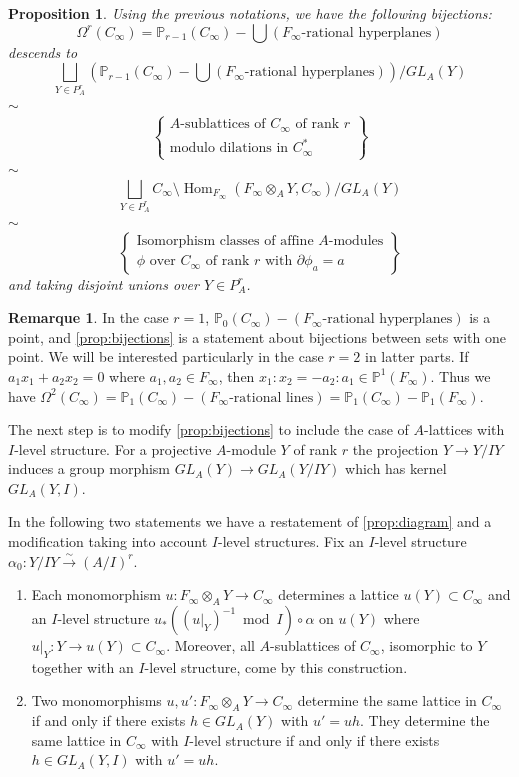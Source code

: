 \documentclass[12pt,a4paper]{article}
\theoremstyle{plain}
\newtheorem{proposition}{Proposition}[section]
\theoremstyle{definition}
\newtheorem{remark}{Remarque}[section]
\theoremstyle{remark}
\DeclareMathOperator{\Hom}{Hom}
\newcommand{\bP}{\mathbb{P}}
\providecommand{\Hom}{\operatorname{Hom}}
\begin{document}
\begin{proposition}
\label{prop:bijections}
Using the previous notations, we have the following bijections:
\[
\Omega^r(C_\infty) = \bP_{r-1}(C_\infty) - \bigcup (F_\infty\text{-rational hyperplanes})
\]
descends to
\[
\bigsqcup_{Y \in P_A^r} (\bP_{r-1}(C_\infty) - \bigcup (F_\infty\text{-rational hyperplanes}))/GL_A(Y)
\]
$\sim$
\[
\left\{\begin{array}{c}
A\text{-sublattices of } C_\infty \text{ of rank } r \\
\text{modulo dilations in } C_\infty^*
\end{array}\right\}
\]
$\sim$
\[
\bigsqcup_{Y \in P_A^r} C_\infty \setminus \Hom_{F_\infty}(F_\infty \otimes_A Y, C_\infty)/GL_A(Y)
\]
$\sim$
\[
\left\{\begin{array}{c}
\text{Isomorphism classes of affine } A\text{-modules} \\
\phi \text{ over } C_\infty \text{ of rank } r \text{ with } \partial \phi_a = a
\end{array}\right\}
\]
and taking disjoint unions over $Y \in P_A^r$.
\end{proposition}

\begin{remark}
\label{rem:r=1}
In the case $r = 1$, $\bP_0(C_\infty) - (F_\infty\text{-rational hyperplanes})$ is a point, and \eqref{prop:bijections} is a statement about bijections between sets with one point. We will be interested particularly in the case $r = 2$ in latter parts. If $a_1 x_1 + a_2 x_2 = 0$ where $a_1, a_2 \in F_\infty$, then $x_1 : x_2 = -a_2 : a_1 \in \bP^1(F_\infty)$. Thus we have $\Omega^2(C_\infty) = \bP_1(C_\infty) - (F_\infty\text{-rational lines}) = \bP_1(C_\infty) - \bP_1(F_\infty)$.
\end{remark}

The next step is to modify \eqref{prop:bijections} to include the case of $A$-lattices with $I$-level structure. For a projective $A$-module $Y$ of rank $r$ the projection $Y \to Y/IY$ induces a group morphism $GL_A(Y) \to GL_A(Y/IY)$ which has kernel $GL_A(Y, I)$.

In the following two statements we have a restatement of \eqref{prop:diagram} and a modification taking into account $I$-level structures. Fix an $I$-level structure $\alpha_0: Y/IY \xrightarrow{\sim} (A/I)^r$.

\begin{enumerate}[label=(\arabic*)]
\item Each monomorphism $u: F_\infty \otimes_A Y \to C_\infty$ determines a lattice $u(Y) \subset C_\infty$ and an $I$-level structure $u_*( (u|_Y)^{-1} \bmod I) \circ \alpha$ on $u(Y)$ where $u|_Y: Y \to u(Y) \subset C_\infty$. Moreover, all $A$-sublattices of $C_\infty$, isomorphic to $Y$ together with an $I$-level structure, come by this construction.
\item Two monomorphisms $u, u': F_\infty \otimes_A Y \to C_\infty$ determine the same lattice in $C_\infty$ if and only if there exists $h \in GL_A(Y)$ with $u' = uh$. They determine the same lattice in $C_\infty$ with $I$-level structure if and only if there exists $h \in GL_A(Y, I)$ with $u' = uh$.
\end{enumerate}
\end{document}
